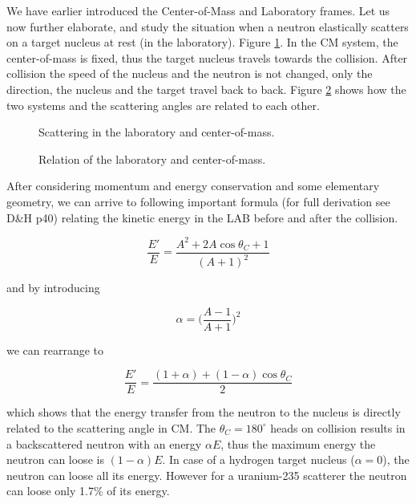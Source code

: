 We have earlier introduced the Center-of-Mass and Laboratory frames. Let us now further elaborate, and study the situation when a neutron elastically scatters on a target nucleus at rest (in the laboratory). Figure \ref{fig:cmlabscatter}. In the CM system, the center-of-mass is fixed, thus the target nucleus travels towards the collision. After collision the speed of the nucleus and the neutron is not changed, only the direction, the nucleus and the target travel back to back. Figure \ref{fig:cmlabrelation} shows how the two systems and the scattering angles are related to each other.

\begin{figure}[ht!]
\protect {}\protect
\caption{\label{fig:cmlabscatter} \footnotesize{Scattering in the laboratory and center-of-mass.}}
\end{figure}

\begin{figure}[ht!]
\protect {}\protect
\caption{\label{fig:cmlabrelation} \footnotesize{Relation of the laboratory and center-of-mass.}}
\end{figure}

After considering momentum and energy conservation and some elementary geometry, we can arrive to following important formula (for full derivation see D\&H p40) relating the kinetic energy in the LAB before and after the collision.

$$\frac{E'}{E}=\frac{A^2+2A\cos\theta_C+1}{(A+1)^2}$$

\noindent and by introducing 

$$\alpha=\Big(\frac{A-1}{A+1}\Big)^2$$

\noindent we can rearrange to

\begin{equation}\label{eq:muErelation}
\frac{E'}{E}=\frac{(1+\alpha)+(1-\alpha)\cos\theta_C}{2}
\end{equation}

\noindent which shows that the energy transfer from the neutron to the nucleus is directly related to the scattering angle in CM. The $\theta_C=180^\circ$ heads on collision results in a backscattered neutron with an energy $\alpha E$, thus the maximum energy the neutron can loose is $(1-\alpha)E$. In case of a hydrogen target nucleus ($\alpha=0$), the neutron can loose all its energy. However for a uranium-235 scatterer the neutron can loose only 1.7\% of its energy.

